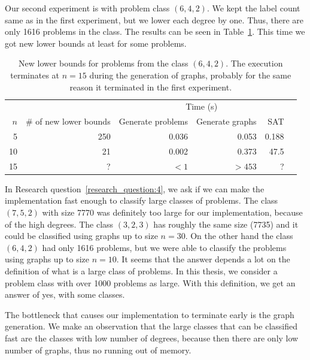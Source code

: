 Our second experiment is with problem class $(6,4,2)$.
We kept the label count same as in the first experiment, but we lower each degree by one.
Thus, there are only 1616 problems in the class.
The results can be seen in Table~\ref{tbl:results:new_lower_bounds_for_classes:6_4_2}.
This time we got new lower bounds at least for some problems.
\begin{table}[H]
    \centering
    \begin{tabular}{rrrrrr}
        \toprule
        && \multicolumn{3}{c}{Time (s)} \\
        \cmidrule{3-5}
        $n$ & \# of new lower bounds & Generate problems & Generate graphs & SAT\\
        \midrule
        5  & 250  & 0.036  & 0.053  & 0.188\\
        10 & 21 & 0.002 & 0.373 & 47.5 \\
        15 & ? & $<1$ & $>453$ & ? \\
        \bottomrule
    \end{tabular}
    \caption{%
    New lower bounds for problems from the class $(6,4,2)$.
    The execution terminates at $n=15$ during the generation of graphs, probably for the same reason it terminated in the first experiment.
    }
    \label{tbl:results:new_lower_bounds_for_classes:6_4_2}
\end{table}

In Research question~\ref{research_question:4}, we ask if we can make the implementation fast enough to classify large classes of problems.
The class $(7,5,2)$ with size 7770 was definitely too large for our implementation, because of the high degrees.
The class $(3,2,3)$ has roughly the same size (7735) and it could be classified using graphs up to size $n=30$.
On the other hand the class $(6,4,2)$ had only 1616 problems, but we were able to classify the problems using graphs up to size $n=10$.
It seems that the answer depends a lot on the definition of what is a large class of problems.
In this thesis, we consider a problem class with over 1000 problems as large.
With this definition, we get an answer of yes, with some classes.

The bottleneck that causes our implementation to terminate early is the graph generation.
We make an observation that the large classes that can be classified fast are the classes with low number of degrees, because then there are only low number of graphs, thus no running out of memory.
